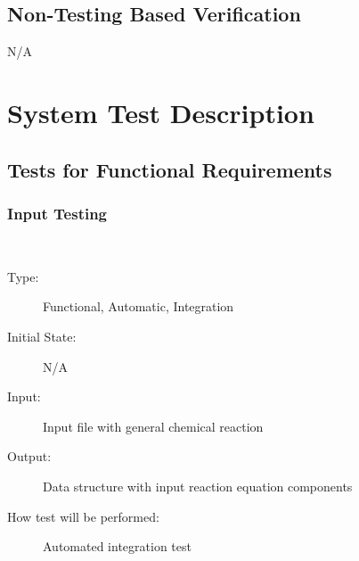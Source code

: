 \documentclass[12pt, titlepage]{article}
\newcounter{testnum} %
\begin{document}
\subsection{Non-Testing Based Verification}
N/A

\section{System Test Description}
\subsection{Tests for Functional Requirements}

\subsubsection{Input Testing}

\\
\begin{addmargin}[2em]{0em}
\begin{description}
\item[Type:] Functional, Automatic, Integration
					
\item[Initial State:] N/A
					
\item[Input:] Input file with general chemical reaction\\
					
\item[Output:] Data structure with input reaction equation components\\
					
\item[How test will be performed:] Automated integration test \\
\end{description}
\end{addmargin}	
\end{document}
